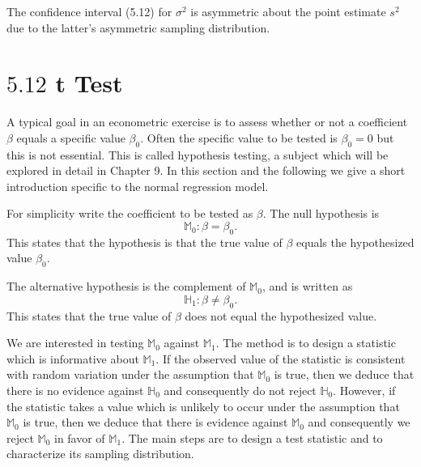 \documentclass[10pt]{article}
\begin{document}
The confidence interval (5.12) for $\sigma^{2}$ is asymmetric about the point estimate $s^{2}$ due to the latter's asymmetric sampling distribution.

\section{$5.12$ t Test}
A typical goal in an econometric exercise is to assess whether or not a coefficient $\beta$ equals a specific value $\beta_{0}$. Often the specific value to be tested is $\beta_{0}=0$ but this is not essential. This is called hypothesis testing, a subject which will be explored in detail in Chapter 9. In this section and the following we give a short introduction specific to the normal regression model.

For simplicity write the coefficient to be tested as $\beta$. The null hypothesis is
$$
\mathbb{M}_{0}: \beta=\beta_{0} .
$$
This states that the hypothesis is that the true value of $\beta$ equals the hypothesized value $\beta_{0}$.

The alternative hypothesis is the complement of $\mathbb{M}_{0}$, and is written as
$$
\mathbb{H}_{1}: \beta \neq \beta_{0} .
$$
This states that the true value of $\beta$ does not equal the hypothesized value.

We are interested in testing $\mathbb{M}_{0}$ against $\mathbb{M}_{1}$. The method is to design a statistic which is informative about $\mathbb{M}_{1}$. If the observed value of the statistic is consistent with random variation under the assumption that $\mathbb{M}_{0}$ is true, then we deduce that there is no evidence against $\mathbb{H}_{0}$ and consequently do not reject $\mathbb{H}_{0}$. However, if the statistic takes a value which is unlikely to occur under the assumption that $\mathbb{M}_{0}$ is true, then we deduce that there is evidence against $\mathbb{M}_{0}$ and consequently we reject $\mathbb{M}_{0}$ in favor of $\mathbb{M}_{1}$. The main steps are to design a test statistic and to characterize its sampling distribution.
\end{document}
